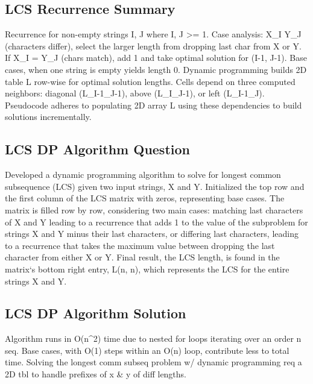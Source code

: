 \subsection*{LCS  Recurrence Summary}
Recurrence for non-empty strings I, J where I, J \textgreater{}= 1.
Case analysis: X\_I  Y\_J (characters differ), select the larger length from dropping last char from X or Y\@.
If X\_I = Y\_J (chars match), add 1 and take optimal solution for (I-1, J-1).
Base cases, when one string is empty yields length 0.
Dynamic programming builds 2D table L row-wise for optimal solution lengths.
Cells depend on three computed neighbors: diagonal (L\_I-1\_J-1), above (L\_I\_J-1), or left (L\_I-1\_J).
Pseudocode adheres to populating 2D array L using these dependencies to build solutions incrementally.

\subsection*{LCS  DP Algorithm Question}
Developed a dynamic programming algorithm to solve for longest common subsequence (LCS) given two input strings, X and Y\@.
Initialized the top row and the first column of the LCS matrix with zeros, representing base cases.
The matrix is filled row by row, considering two main cases: matching last characters of X and Y leading to a recurrence that adds 1 to the value of the subproblem for strings X and Y minus their last characters, or differing last characters, leading to a recurrence that takes the maximum value between dropping the last character from either X or Y\@.
Final result, the LCS length, is found in the matrix`s bottom right entry, L(n, n), which represents the LCS for the entire strings X and Y\@.

\subsection*{LCS  DP Algorithm Solution}
Algorithm runs in O(n\textasciicircum{}2) time due to nested for loops iterating over an order n seq.
Base cases, with O(1) steps within an O(n) loop, contribute less to total time.
Solving the longest comm subseq problem w/ dynamic programming req a 2D tbl to handle prefixes of x \& y of diff lengths.

